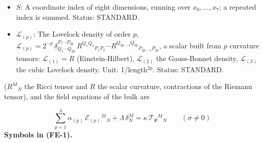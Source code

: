 \documentclass[
  10pt,
]{article}
\begin{document}
\begin{itemize}
  the convention in which the commutator of two covariant derivatives,
  acting on a vector, is the Riemann tensor, with its last two indices
  those of the two derivatives, contracted with the vector), with two
  indices the Ricci tensor \(R_{MN} = R^P{}_{MPN}\), without indices the
  scalar curvature \(R = g^{MN}R_{MN}\); with frame indices
  \(R^{(a)(b)}{}_{(c)(d)}\) its frame components,
  \(R^{(a)(b)}{}_{(a)(b)}\) (no sum) the sectional curvature of the
  frame plane \((a, b)\). Unit: 1/length\(^2\). Status: STANDARD.
\item
  \(S\): A coordinate index of eight dimensions, running over
  \(x_0, \dots, x_7\); a repeated index is summed. Status: STANDARD.
\item
  \(\mathcal{L}_{(p)}\): The Lovelock density of order \(p\),
  \(\mathcal{L}_{(p)} = 2^{-p}\,\delta^{P_1\cdots P_{2p}}_{Q_1\cdots Q_{2p}}\,R^{Q_1Q_2}{}_{P_1P_2}\cdots R^{Q_{2p-1}Q_{2p}}{}_{P_{2p-1}P_{2p}}\),
  a scalar built from \(p\) curvature tensors: \(\mathcal{L}_{(1)} = R\)
  (Einstein-Hilbert), \(\mathcal{L}_{(2)}\) the Gauss-Bonnet density,
  \(\mathcal{L}_{(3)}\) the cubic Lovelock density. Unit:
  1/length\(^{2p}\). Status: STANDARD.
\end{itemize}

(\(R^M{}_N\) the Ricci tensor and \(R\) the scalar curvature,
contractions of the Riemann tensor), and the field equations of the bulk
are

\[
\sum_{p=1}^{3}\alpha_{(p)}\,\mathcal{E}_{(p)}{}^M{}_N + \Lambda\,\delta^M_N
 = \kappa\,\mathcal{T}_\Psi{}^M{}_N\qquad (\sigma \ne 0) \tag{FE-1}
\] \textbf{Symbols in (FE-1).}
\end{document}
